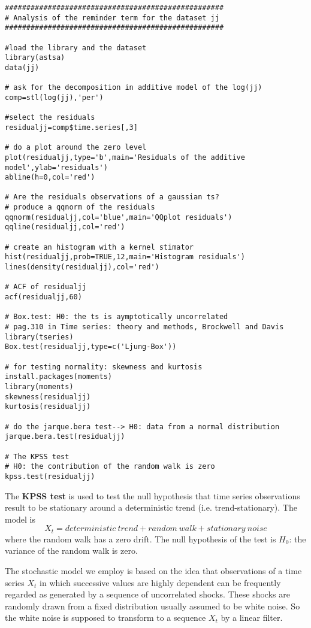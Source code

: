 \begin{example}
    \begin{verbatim}
###################################################
# Analysis of the reminder term for the dataset jj
###################################################

#load the library and the dataset
library(astsa)
data(jj)

# ask for the decomposition in additive model of the log(jj)
comp=stl(log(jj),'per')

#select the residuals
residualjj=comp$time.series[,3]

# do a plot around the zero level
plot(residualjj,type='b',main='Residuals of the additive model',ylab='residuals')
abline(h=0,col='red')

# Are the residuals observations of a gaussian ts?
# produce a qqnorm of the residuals
qqnorm(residualjj,col='blue',main='QQplot residuals')
qqline(residualjj,col='red')

# create an histogram with a kernel stimator
hist(residualjj,prob=TRUE,12,main='Histogram residuals')
lines(density(residualjj),col='red')

# ACF of residualjj
acf(residualjj,60)

# Box.test: H0: the ts is aymptotically uncorrelated
# pag.310 in Time series: theory and methods, Brockwell and Davis
library(tseries)
Box.test(residualjj,type=c('Ljung-Box'))

# for testing normality: skewness and kurtosis
install.packages(moments)
library(moments)
skewness(residualjj)
kurtosis(residualjj)

# do the jarque.bera test--> H0: data from a normal distribution
jarque.bera.test(residualjj)

# The KPSS test
# H0: the contribution of the random walk is zero
kpss.test(residualjj)
    \end{verbatim}
\end{example}

The \textbf{KPSS test} is used to test the null hypothesis that time series observations result to be stationary around a deterministic trend (i.e. trend-stationary). The model is
\[
    X_t=deterministic\ trend+random\ walk+stationary\ noise  
\]
where the random walk has a zero drift. The null hypothesis of the test is $H_0$: the variance of the random walk is zero.

The stochastic model we employ is based on the idea that observations of a time series $X_t$ in which successive values are highly dependent can be frequently regarded as generated by a sequence of uncorrelated shocks. These shocks are randomly drawn from a fixed distribution usually assumed to be white noise. So the white noise is supposed to transform to a sequence $X_t$ by a linear filter.

